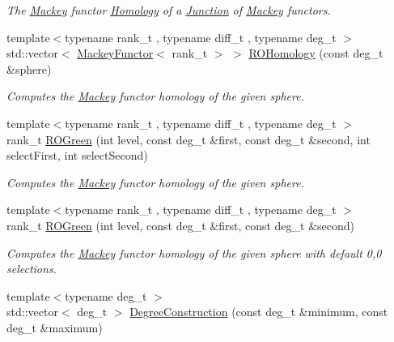 \begin{DoxyCompactItemize}
\begin{DoxyCompactList}\small\item\em The \hyperlink{namespaceMackey}{Mackey} functor \hyperlink{classMackey_1_1Homology}{Homology} of a \hyperlink{classMackey_1_1Junction}{Junction} of \hyperlink{namespaceMackey}{Mackey} functors. \end{DoxyCompactList}\item 
{\footnotesize template$<$typename rank\+\_\+t , typename diff\+\_\+t , typename deg\+\_\+t $>$ }\\std\+::vector$<$ \hyperlink{classMackey_1_1MackeyFunctor}{Mackey\+Functor}$<$ rank\+\_\+t $>$ $>$ \hyperlink{namespaceMackey_a58708ee937b0c4172b7cde8e5f856504}{R\+O\+Homology} (const deg\+\_\+t \&sphere)
\begin{DoxyCompactList}\small\item\em Computes the \hyperlink{namespaceMackey}{Mackey} functor homology of the given sphere. \end{DoxyCompactList}\item 
{\footnotesize template$<$typename rank\+\_\+t , typename diff\+\_\+t , typename deg\+\_\+t $>$ }\\rank\+\_\+t \hyperlink{namespaceMackey_a2bd86833844ca62d76c47a54aeb0bb77}{R\+O\+Green} (int level, const deg\+\_\+t \&first, const deg\+\_\+t \&second, int select\+First, int select\+Second)
\begin{DoxyCompactList}\small\item\em Computes the \hyperlink{namespaceMackey}{Mackey} functor homology of the given sphere. \end{DoxyCompactList}\item 
{\footnotesize template$<$typename rank\+\_\+t , typename diff\+\_\+t , typename deg\+\_\+t $>$ }\\rank\+\_\+t \hyperlink{namespaceMackey_a07d3b1e748c6cf2fd8a6e21b948a0afe}{R\+O\+Green} (int level, const deg\+\_\+t \&first, const deg\+\_\+t \&second)
\begin{DoxyCompactList}\small\item\em Computes the \hyperlink{namespaceMackey}{Mackey} functor homology of the given sphere with default 0,0 selections. \end{DoxyCompactList}\item 
{\footnotesize template$<$typename deg\+\_\+t $>$ }\\std\+::vector$<$ deg\+\_\+t $>$ \hyperlink{namespaceMackey_a49fef6f64b67ff118d35ac45b9c92972}{Degree\+Construction} (const deg\+\_\+t \&minimum, const deg\+\_\+t \&maximum)

\end{DoxyCompactItemize}
